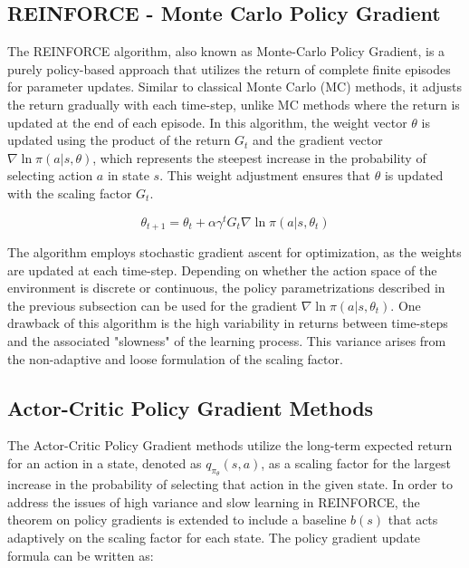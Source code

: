 \documentclass[../xlapes02]{subfiles}
\begin{document}
    \subsection{REINFORCE - Monte Carlo Policy Gradient}\label{subsec:monte-carlo-policy-gradient-methods}
    The REINFORCE algorithm, also known as Monte-Carlo Policy Gradient, is a purely policy-based approach that utilizes the return of complete finite episodes for parameter updates. Similar to classical Monte Carlo (MC) methods, it adjusts the return gradually with each time-step, unlike MC methods where the return is updated at the end of each episode. In this algorithm, the weight vector $\theta$ is updated using the product of the return $G_t$ and the gradient vector $\nabla \ln \pi(a | s, \theta)$, which represents the steepest increase in the probability of selecting action $a$ in state $s$. This weight adjustment ensures that $\theta$ is updated with the scaling factor $G_t$.

    \begin{equation}
        \theta_{t+1} = \theta_{t} + \alpha \gamma^{t} G_t \nabla \ln \pi(a | s, \theta_t)
    \end{equation}


    The algorithm employs stochastic gradient ascent for optimization, as the weights are updated at each time-step. Depending on whether the action space of the environment is discrete or continuous, the policy parametrizations described in the previous subsection can be used for the gradient $\nabla \ln \pi(a | s, \theta_t)$. One drawback of this algorithm is the high variability in returns between time-steps and the associated "slowness" of the learning process. This variance arises from the non-adaptive and loose formulation of the scaling factor.

    \subsection{Actor-Critic Policy Gradient Methods}\label{subsec:actor-critic-policy-gradient-methods}
    The Actor-Critic Policy Gradient methods utilize the long-term expected return for an action in a state, denoted as $q_{\pi_\theta}(s, a)$, as a scaling factor for the largest increase in the probability of selecting that action in the given state. In order to address the issues of high variance and slow learning in REINFORCE, the theorem on policy gradients is extended to include a baseline $b(s)$ that acts adaptively on the scaling factor for each state. The policy gradient update formula can be written as:
\end{document}
